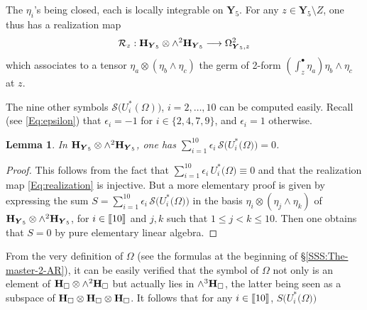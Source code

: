 \documentclass[11pt]{amsart}
\newtheorem{lem}[thm]{Lemma}
\begin{document}
The $\eta_i$'s being closed, each is locally integrable on $\boldsymbol{Y}_5$. For any $z\in \boldsymbol{Y}_5\setminus Z$, one thus has a realization map 
\begin{equation}
\label{Eq:realization}
\mathcal R_z : {\bf H}_{\boldsymbol{Y}_5}\otimes \wedge^2
 {\bf H}_{\boldsymbol{Y}_5} \longrightarrow \Omega^2_{\boldsymbol{Y}_5,z}
\end{equation}
 which associates to a tensor $\eta_a\otimes (\eta_b\wedge \eta_c)$ the germ of 2-form 
 $(\int_{z}^\bullet \eta_a)\eta_b\wedge \eta_c$ at $z$.
 
 The nine other symbols $\mathcal S\big(  U_i^*(\Omega)\big)$, $i=2,\ldots,10$ can be computed easily. Recall (see \eqref{Eq:epsilon}) that $\epsilon_i=-1$ for $i\in \{2,4,7,9\}$, and $\epsilon_i=1$ otherwise. 
 \begin{lem}  
 \label{Lemma:1}
 In ${\bf H}_{\boldsymbol{Y}_5}\otimes \wedge^2
 {\bf H}_{\boldsymbol{Y}_5}$, one has 
 $
 \sum_{i=1}^{10} \epsilon_i \,  \mathcal S\big(  U_i^*\big(\Omega\big)\big)=0
 $.
 \end{lem}
 \begin{proof}
 This follows from the fact that $ \sum_{i=1}^{10} \epsilon_i \,   U_i^*\big(\Omega\big)\equiv 0$ and that the realization map \eqref{Eq:realization} is injective. But a more elementary proof is given by expressing the sum $S=
 \sum_{i=1}^{10} \epsilon_i \,  \mathcal S\big(  U_i^*\big(\Omega\big)\big)$  in the basis 
 $\eta_i\otimes (\eta_j\wedge \eta_k)$ of ${\bf H}_{\boldsymbol{Y}_5}\otimes \wedge^2
 {\bf H}_{\boldsymbol{Y}_5}$, for $i\in [\hspace{-0.05cm}[ 10  ]\hspace{-0.05cm}]$ and 
 $j,k$ such that $1\leq j<k\leq 10$.  Then one obtains that $S=0$ by pure elementary linear algebra.
\end{proof} 
From the very definition of $\Omega$ (see the formulas at the beginning of \S\ref{SSS:The-master-2-AR}), it can be easily verified that the symbol of $\Omega$
not only is an element of  
${\bf H}_{\square}\otimes \wedge^2
 {\bf H}_{\square}$ but actually lies in 
$\wedge^3 {\bf H}_{\square}$, the latter being seen as a subspace of $
 {\bf H}_{\square}\otimes {\bf H}_{\square}\otimes {\bf H}_{\square}$. It follows that 
 for any $i\in [\hspace{-0.05cm}[ 10  ]\hspace{-0.05cm}]$,  $S\big(  U_i^*\big(\Omega\big)\big)$
\end{document}
